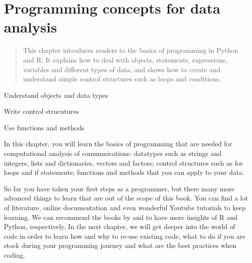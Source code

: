 \chapter{Programming concepts for data analysis}
\label{chap:programmingconcepts}

\begin{abstract}This chapter introduces readers to the basics of programming
  in Python and R. It
explains how to deal with objects, statements, expressions, variables
and different types of data, and shows how to create and understand
simple control structures such as loops and conditions.
\end{abstract}


\begin{objectives}
\item Understand objects and data types
\item Write control strucutures
\item Use functions and methods
\end{objectives}

\begin{feature}
In this chapter, you will learn the
basics of programming that are needed for computational analysis of
communications: datatypes such as strings and integers, lists and
dictionaries, vectors and factors; control structures such as for
loops and if statements; functions and methods that you can apply to
your data.

\end{feature}








So far you have taken your first steps as a programmer, but there many
more advanced things to learn that are out of the scope of this
book. You can find a lot of literature, online documentation and even
wonderful Youtube tutorials to keep learning. We can recommend the
books by \cite{crawley2012r} and \cite{vanderplas2016python} to have
more insights of R and Python, respectively. In the next chapter, we
will get deeper into the world of code in order to learn how and why
to re-use existing code, what to do if you are stock during your
programming journey and what are the best practices when coding.
